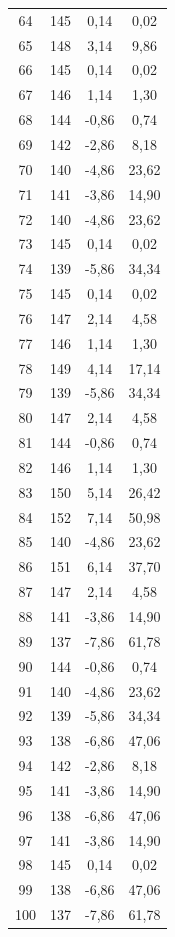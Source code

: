 \begin{xltabular}{\textwidth}{|c|c|c|c|}
	64  & 145 & 0,14  & 0,02  \\
	65  & 148 & 3,14  & 9,86  \\
	66  & 145 & 0,14  & 0,02  \\
	67  & 146 & 1,14  & 1,30  \\
	68  & 144 & -0,86 & 0,74  \\
	69  & 142 & -2,86 & 8,18  \\
	70  & 140 & -4,86 & 23,62 \\
	71  & 141 & -3,86 & 14,90 \\
	72  & 140 & -4,86 & 23,62 \\
	73  & 145 & 0,14  & 0,02  \\
	74  & 139 & -5,86 & 34,34 \\
	75  & 145 & 0,14  & 0,02  \\
	76  & 147 & 2,14  & 4,58  \\
	77  & 146 & 1,14  & 1,30  \\
	78  & 149 & 4,14  & 17,14 \\
	79  & 139 & -5,86 & 34,34 \\
	80  & 147 & 2,14  & 4,58  \\
	81  & 144 & -0,86 & 0,74  \\
	82  & 146 & 1,14  & 1,30  \\
	83  & 150 & 5,14  & 26,42 \\
	84  & 152 & 7,14  & 50,98 \\
	85  & 140 & -4,86 & 23,62 \\
	86  & 151 & 6,14  & 37,70 \\
	87  & 147 & 2,14  & 4,58  \\
	88  & 141 & -3,86 & 14,90 \\
	89  & 137 & -7,86 & 61,78 \\
	90  & 144 & -0,86 & 0,74  \\
	91  & 140 & -4,86 & 23,62 \\
	92  & 139 & -5,86 & 34,34 \\
	93  & 138 & -6,86 & 47,06 \\
	94  & 142 & -2,86 & 8,18  \\
	95  & 141 & -3,86 & 14,90 \\
	96  & 138 & -6,86 & 47,06 \\
	97  & 141 & -3,86 & 14,90 \\
	98  & 145 & 0,14  & 0,02  \\
	99  & 138 & -6,86 & 47,06 \\
	100 & 137 & -7,86 & 61,78 \\
\end{xltabular}

